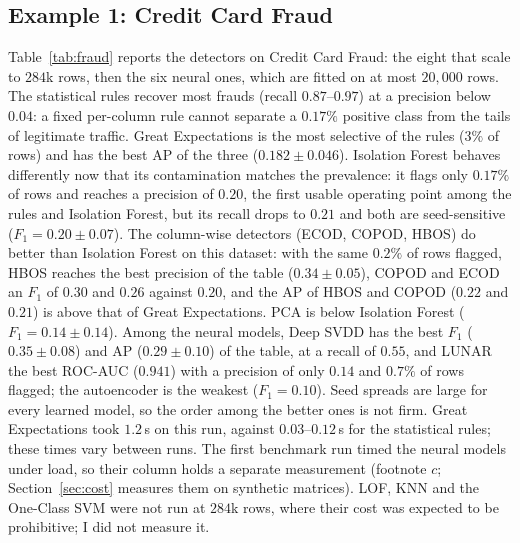 \documentclass[conference]{IEEEtran}
\begin{document}
\subsection{Example 1: Credit Card Fraud}
Table~\ref{tab:fraud} reports the detectors on Credit Card Fraud: the
eight that scale to $284$k rows, then the six neural ones, which are fitted on
at most $20{,}000$ rows. The
statistical rules recover most frauds (recall $0.87$--$0.97$) at a
precision below $0.04$: a fixed per-column rule cannot separate a
$0.17\%$ positive class from the tails of legitimate traffic. Great
Expectations is the most selective of the rules ($3\%$ of rows) and has the best
AP of the three ($0.182 \pm 0.046$). Isolation Forest behaves differently now that its
contamination matches the prevalence: it flags only $0.17\%$ of rows and
reaches a precision of $0.20$, the first usable operating point among the
rules and Isolation Forest, but its recall drops to $0.21$ and both are seed-sensitive
($F_1 = 0.20 \pm 0.07$). The column-wise detectors (ECOD, COPOD, HBOS) do better than
Isolation Forest on this dataset: with the same $0.2\%$ of rows flagged, HBOS reaches the best
precision of the table ($0.34 \pm 0.05$), COPOD and ECOD an $F_1$ of $0.30$ and
$0.26$ against $0.20$, and the AP of HBOS and COPOD ($0.22$ and $0.21$) is above that of
Great Expectations. PCA is below Isolation Forest ($F_1 = 0.14 \pm 0.14$). Among the neural
models, Deep SVDD has the best $F_1$ ($0.35 \pm 0.08$) and AP ($0.29 \pm 0.10$) of the
table, at a recall of $0.55$, and LUNAR the best ROC-AUC ($0.941$) with a precision of only
$0.14$ and $0.7\%$ of rows flagged; the autoencoder is the weakest ($F_1 = 0.10$). Seed spreads
are large for every learned model, so the order among the better ones is not firm. Great
Expectations took $1.2$\,s on this run, against $0.03$--$0.12$\,s for the
statistical rules; these times vary between runs. The first benchmark run timed the neural models under load, so
their column holds a separate measurement (footnote $c$; Section~\ref{sec:cost} measures them on synthetic matrices). LOF, KNN and the
One-Class SVM were not run at $284$k rows, where their cost was expected to
be prohibitive; I did not measure it.
\end{document}
